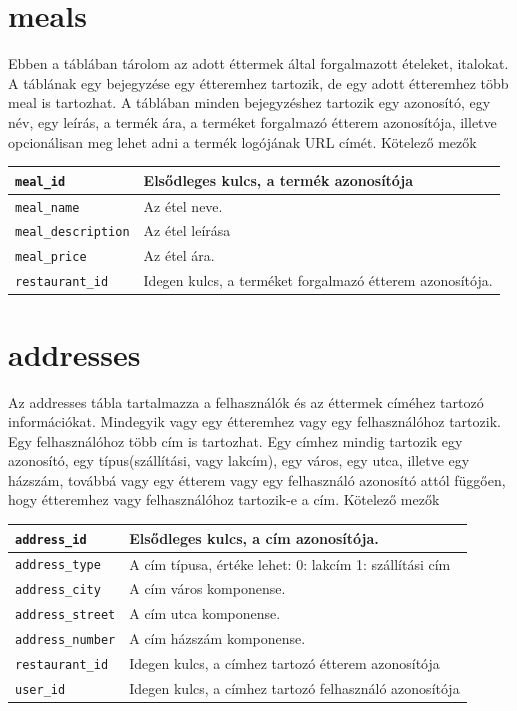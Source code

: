 \section{meals}

Ebben a táblában tárolom az adott éttermek által forgalmazott ételeket, italokat. A táblának egy bejegyzése egy étteremhez tartozik, de egy adott étteremhez több meal is tartozhat. A táblában minden bejegyzéshez tartozik egy azonosító, egy név, egy leírás, a termék ára, a terméket forgalmazó étterem azonosítója, illetve opcionálisan meg lehet adni a termék logójának URL címét.
Kötelező mezők

\begin{tabular}{|p{3cm}|p{10cm}|}
    \hline
    \texttt{meal\_id} & Elsődleges kulcs, a termék azonosítója \\
    \hline
    \texttt{meal\_name} & Az étel neve. \\
    \hline
    \texttt{meal\_description} & Az étel leírása \\
    \hline
    \texttt{meal\_price} & Az étel ára. \\
    \hline
    \texttt{restaurant\_id} & Idegen kulcs, a terméket forgalmazó étterem azonosítója. \\
    \hline
\end{tabular}

\section{addresses}

Az addresses tábla tartalmazza a felhasználók és az éttermek címéhez tartozó információkat. Mindegyik vagy egy étteremhez vagy egy felhasználóhoz tartozik. Egy felhasználóhoz több cím is tartozhat. Egy címhez mindig tartozik egy azonosító, egy típus(szállítási, vagy lakcím), egy város, egy utca, illetve egy házszám, továbbá vagy egy étterem vagy egy felhasználó azonosító attól függően, hogy étteremhez vagy felhasználóhoz tartozik-e a cím.
Kötelező mezők

\begin{tabular}{|p{3cm}|p{10cm}|}
    \hline
    \texttt{address\_id} & Elsődleges kulcs, a cím azonosítója. \\
    \hline
    \texttt{address\_type} & A cím típusa, értéke lehet: 0: lakcím 1: szállítási cím \\
    \hline
    \texttt{address\_city} & A cím város komponense. \\
    \hline
    \texttt{address\_street} & A cím utca komponense. \\
    \hline
    \texttt{address\_number} & A cím házszám komponense. \\
    \hline
    \texttt{restaurant\_id} & Idegen kulcs, a címhez tartozó étterem azonosítója \\
    \hline
    \texttt{user\_id} & Idegen kulcs, a címhez tartozó felhasználó azonosítója \\
    \hline
\end{tabular}

